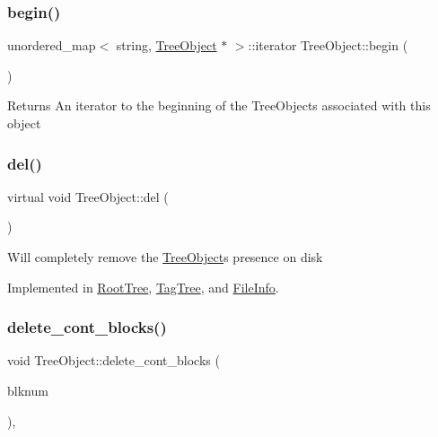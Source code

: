 \subsubsection{\texorpdfstring{begin()}{begin()}}
{\footnotesize\ttfamily unordered\+\_\+map$<$ string, \mbox{\hyperlink{class_tree_object}{Tree\+Object}} $\ast$ $>$\+::iterator Tree\+Object\+::begin (\begin{DoxyParamCaption}{ }\end{DoxyParamCaption})}

\begin{DoxyReturn}{Returns}
An iterator to the beginning of the Tree\+Objects associated with this object 
\end{DoxyReturn}
\mbox{\label{class_tree_object_af390b7479aa972888e594c07a85740b6}} 
\subsubsection{\texorpdfstring{del()}{del()}}
{\footnotesize\ttfamily virtual void Tree\+Object\+::del (\begin{DoxyParamCaption}{ }\end{DoxyParamCaption})\hspace{0.3cm}{\ttfamily [pure virtual]}}

Will completely remove the \mbox{\hyperlink{class_tree_object}{Tree\+Object}}\textquotesingle{}s presence on disk 

Implemented in \mbox{\hyperlink{class_root_tree_ac431dc04b767fc66791c251d8173650d}{Root\+Tree}}, \mbox{\hyperlink{class_tag_tree_ad8108969f4d28b938e55c8339f19db35}{Tag\+Tree}}, and \mbox{\hyperlink{class_file_info_a2ca34d945ed1208f227a249ba72ee427}{File\+Info}}.

\mbox{\label{class_tree_object_a07f5f5de1cff0cfdc2372e81559f5181}} 
\subsubsection{\texorpdfstring{delete\+\_\+cont\+\_\+blocks()}{delete\_cont\_blocks()}}
{\footnotesize\ttfamily void Tree\+Object\+::delete\+\_\+cont\+\_\+blocks (\begin{DoxyParamCaption}\item[{Blk\+Num\+Type}]{blknum }\end{DoxyParamCaption})\hspace{0.3cm}{\ttfamily [protected]}, {\ttfamily [virtual]}}

